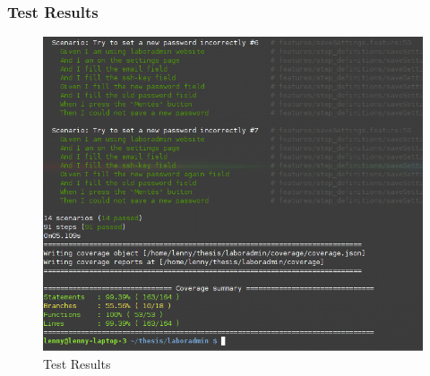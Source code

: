 \subsubsection{Test Results}

\begin{figure}[!ht]
	\includegraphics[width=\textwidth]{figures/test-result.png}
	\caption{Test Results}
	\label{fig:test-results}
	\end{figure}

